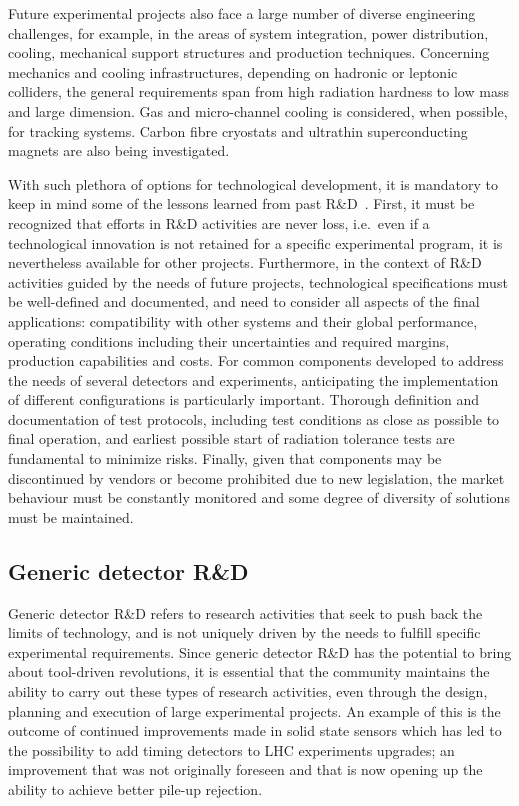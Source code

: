 Future experimental projects also face a large number of diverse engineering challenges, for example, in the areas of system integration, power distribution, cooling, mechanical support structures and production techniques.  Concerning mechanics and cooling infrastructures, depending on hadronic or leptonic colliders, the general requirements span from high radiation hardness to low mass and large dimension. Gas and micro-channel cooling is considered, when possible, for tracking systems.  Carbon fibre cryostats and ultrathin superconducting magnets are also being investigated.

With such plethora of options for technological development, it is mandatory to keep in mind some of the lessons learned from past R\&D~\cite{bib:DC-talk}. First, it must be recognized that efforts in R\&D activities are never loss, i.e.\ even if a technological innovation is not retained for a specific experimental program, it is nevertheless available for other projects.   Furthermore, in the context of R\&D activities guided by the needs of future projects, technological specifications must be well-defined and documented, and need to consider all aspects of the final applications: compatibility with other systems and their global performance, operating conditions including their uncertainties and required margins, production capabilities and costs. For common components developed to address the needs of several detectors and experiments, anticipating the implementation of different configurations is particularly important. 
Thorough definition and documentation of test protocols, including test conditions as close as possible to final operation, and earliest possible start of radiation tolerance tests are fundamental to minimize risks.
Finally, given that components may be discontinued by vendors or become prohibited due to new legislation, the market behaviour must be constantly monitored and some degree of diversity of solutions must be maintained.

\subsection{Generic detector R\&D}

Generic detector R\&D refers to research activities that seek to push back the limits of technology, and is not uniquely driven by the needs to fulfill specific experimental requirements.  Since generic detector R\&D has the potential to bring about tool-driven revolutions, it is essential that the community maintains the ability to carry out these types of research activities, even through the design, planning and execution of large experimental projects.  An example of this is the outcome of continued improvements made in solid state sensors which has led to the possibility to add timing detectors to LHC experiments upgrades; an improvement that was not originally foreseen and that is now opening up the ability to achieve better pile-up rejection.  

